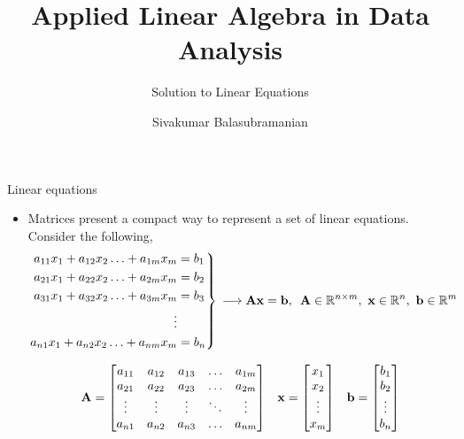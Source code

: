 \documentclass[aspectratio=169]{beamer}
\title{Applied Linear Algebra in Data Analysis}
\subtitle{Solution to Linear Equations}
\author{Sivakumar Balasubramanian}
\institute[Christian Medical College] %
{
  \inst{}%
  Department of Bioengineering\\
  Christian Medical College, Bagayam\\
  Vellore 632002
}
\date{}
\let\olditem\item
\renewcommand{\item}{\setlength{\itemsep}{\fill}\olditem}
\def\mf{\ensuremath\mathbf}
\begin{document}
\begin{frame}
  \titlepage
\end{frame}


\begin{frame}[t]{Linear equations}
\begin{itemize}
\item Matrices present a compact way to represent a set of linear equations. Consider the following,
\[
\begin{rcases*}
\begin{split}
a_{11}x_1 + a_{12}x_2 \ldots + a_{1m}x_m & = b_1 \\
a_{21}x_1 + a_{22}x_2 \ldots + a_{2m}x_m & = b_2 \\
a_{31}x_1 + a_{32}x_2 \ldots + a_{3m}x_m & = b_3 \\
\vdots \\
a_{n1}x_1 + a_{n2}x_2 \ldots + a_{nm}x_m & = b_n \\
\end{split}
\end{rcases*} \, \longrightarrow \mf{Ax} = \mf{b}, \,\,\, \mf{A} \in \mathbb{R}^{n \times m}, \,\, \mf{x} \in \mathbb{R}^n, \,\, \mf{b} \in \mathbb{R}^m
\]

\[
\mf{A} = \begin{bmatrix}
a_{11} & a_{12} & a_{13} & \ldots & a_{1m}\\
a_{21} & a_{22} & a_{23} & \ldots & a_{2m}\\
\vdots & \vdots & \vdots & \ddots & \vdots\\
a_{n1} & a_{n2} & a_{n3} & \ldots & a_{nm}\\
\end{bmatrix} \,\,\,\,\, 
\mf{x} = \begin{bmatrix}
x_1\\ x_2\\ \vdots \\ x_m
\end{bmatrix} \,\,\,\,\,
\mf{b} = \begin{bmatrix}
b_1\\ b_2\\ \vdots \\ b_n
\end{bmatrix}
\]
\end{itemize}
\end{frame}
\end{document}
